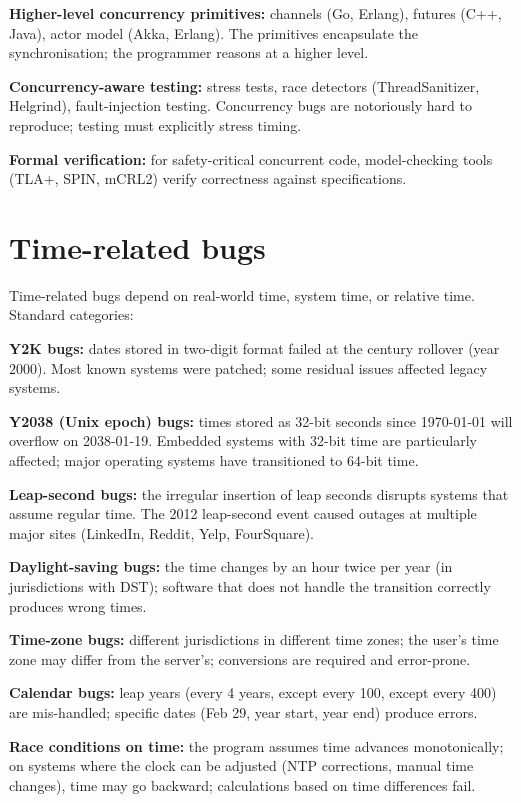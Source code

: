 \textbf{Higher-level concurrency primitives:} channels (Go, Erlang), futures (C++, Java), actor model (Akka, Erlang). The primitives encapsulate the synchronisation; the programmer reasons at a higher level.

\textbf{Concurrency-aware testing:} stress tests, race detectors (ThreadSanitizer, Helgrind), fault-injection testing. Concurrency bugs are notoriously hard to reproduce; testing must explicitly stress timing.

\textbf{Formal verification:} for safety-critical concurrent code, model-checking tools (TLA+, SPIN, mCRL2) verify correctness against specifications.

\section{Time-related bugs}

Time-related bugs depend on real-world time, system time, or relative time. Standard categories:

\textbf{Y2K bugs:} dates stored in two-digit format failed at the century rollover (year $2000$). Most known systems were patched; some residual issues affected legacy systems.

\textbf{Y2038 (Unix epoch) bugs:} times stored as 32-bit seconds since 1970-01-01 will overflow on 2038-01-19. Embedded systems with $32$-bit time are particularly affected; major operating systems have transitioned to $64$-bit time.

\textbf{Leap-second bugs:} the irregular insertion of leap seconds disrupts systems that assume regular time. The 2012 leap-second event caused outages at multiple major sites (LinkedIn, Reddit, Yelp, FourSquare).

\textbf{Daylight-saving bugs:} the time changes by an hour twice per year (in jurisdictions with DST); software that does not handle the transition correctly produces wrong times.

\textbf{Time-zone bugs:} different jurisdictions in different time zones; the user's time zone may differ from the server's; conversions are required and error-prone.

\textbf{Calendar bugs:} leap years (every 4 years, except every 100, except every 400) are mis-handled; specific dates (Feb 29, year start, year end) produce errors.

\textbf{Race conditions on time:} the program assumes time advances monotonically; on systems where the clock can be adjusted (NTP corrections, manual time changes), time may go backward; calculations based on time differences fail.

